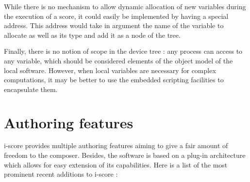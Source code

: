 \documentclass{article}
\begin{document}
While there is no mechanism to allow dynamic allocation of new variables during the execution of a score, it could easily be implemented by having a special address.
This address would take in argument the name of the variable to allocate as well as its type and add it as a node of the tree.

Finally, there is no notion of scope in the device tree : any process can access to any variable, which 
should be considered elements of the object model of the local software.
However, when local variables are necessary for complex computations, it 
may be better to use the embedded scripting facilities to encapsulate them.

\section{Authoring features}
i-score provides multiple authoring features aiming to give a fair amount of freedom to the composer.
Besides, the software is based on a plug-in architecture which 
allows for easy extension of its capabilities.
Here is a list of the most prominent recent additions to i-score : 
\end{document}
